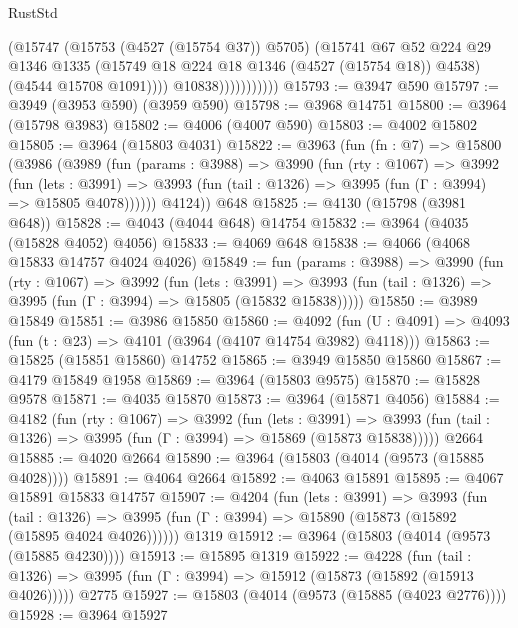 \begin{lexlean}{RustStd}
\begin{coremodule}
                            (@15747
                              (@15753 (@4527 (@15754 @37)) @5705)
                              (@15741
                                @67
                                @52
                                @224
                                @29
                                @1346
                                @1335
                                (@15749 @18 @224 @18 @1346 (@4527 (@15754 @18)) @4538)
                                (@4544 @15708 @1091))))
                          @10838)))))))))))
@15793 := @3947 @590
@15797 := @3949 (@3953 @590) (@3959 @590)
@15798 := @3968 @14751
@15800 := @3964 (@15798 @3983)
@15802 := @4006 (@4007 @590)
@15803 := @4002 @15802
@15805 := @3964 (@15803 @4031)
@15822 := @3963
    (fun (fn : @7) =>
    @15800
      (@3986
        (@3989
          (fun (params : @3988) =>
          @3990
            (fun (rty : @1067) =>
            @3992
              (fun (lets : @3991) =>
              @3993 (fun (tail : @1326) => @3995 (fun (Γ : @3994) => @15805 @4078))))))
        @4124))
    @648
@15825 := @4130 (@15798 (@3981 @648))
@15828 := @4043 (@4044 @648) @14754
@15832 := @3964 (@4035 (@15828 @4052) @4056)
@15833 := @4069 @648
@15838 := @4066 (@4068 @15833 @14757 @4024 @4026)
@15849 := fun (params : @3988) =>
  @3990
    (fun (rty : @1067) =>
    @3992
      (fun (lets : @3991) =>
      @3993 (fun (tail : @1326) => @3995 (fun (Γ : @3994) => @15805 (@15832 @15838)))))
@15850 := @3989 @15849
@15851 := @3986 @15850
@15860 := @4092
    (fun (U : @4091) => @4093 (fun (t : @23) => @4101 (@3964 (@4107 @14754 @3982) @4118)))
@15863 := @15825 (@15851 @15860) @14752
@15865 := @3949 @15850 @15860
@15867 := @4179 @15849 @1958
@15869 := @3964 (@15803 @9575)
@15870 := @15828 @9578
@15871 := @4035 @15870
@15873 := @3964 (@15871 @4056)
@15884 := @4182
    (fun (rty : @1067) =>
    @3992
      (fun (lets : @3991) =>
      @3993 (fun (tail : @1326) => @3995 (fun (Γ : @3994) => @15869 (@15873 @15838)))))
    @2664
@15885 := @4020 @2664
@15890 := @3964 (@15803 (@4014 (@9573 (@15885 @4028))))
@15891 := @4064 @2664
@15892 := @4063 @15891
@15895 := @4067 @15891 @15833 @14757
@15907 := @4204
    (fun (lets : @3991) =>
    @3993
      (fun (tail : @1326) =>
      @3995 (fun (Γ : @3994) => @15890 (@15873 (@15892 (@15895 @4024 @4026))))))
    @1319
@15912 := @3964 (@15803 (@4014 (@9573 (@15885 @4230))))
@15913 := @15895 @1319
@15922 := @4228
    (fun (tail : @1326) => @3995 (fun (Γ : @3994) => @15912 (@15873 (@15892 (@15913 @4026)))))
    @2775
@15927 := @15803 (@4014 (@9573 (@15885 (@4023 @2776))))
@15928 := @3964 @15927

\end{coremodule}
\end{lexlean}

